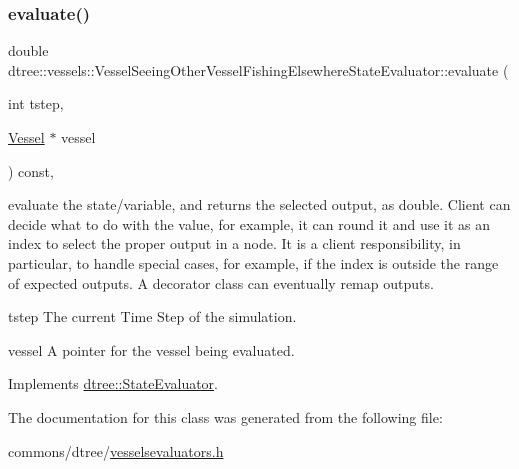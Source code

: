 \subsubsection{\texorpdfstring{evaluate()}{evaluate()}}
{\footnotesize\ttfamily double dtree\+::vessels\+::\+Vessel\+Seeing\+Other\+Vessel\+Fishing\+Elsewhere\+State\+Evaluator\+::evaluate (\begin{DoxyParamCaption}\item[{int}]{tstep,  }\item[{\mbox{\hyperlink{class_vessel}{Vessel}} $\ast$}]{vessel }\end{DoxyParamCaption}) const\hspace{0.3cm}{\ttfamily [inline]}, {\ttfamily [virtual]}}



evaluate the state/variable, and returns the selected output, as double. Client can decide what to do with the value, for example, it can round it and use it as an index to select the proper output in a node. It is a client responsibility, in particular, to handle special cases, for example, if the index is outside the range of expected outputs. A decorator class can eventually remap outputs. 

\begin{DoxyItemize}
\item tstep The current Time Step of the simulation. \item vessel A pointer for the vessel being evaluated. \end{DoxyItemize}


Implements \mbox{\hyperlink{classdtree_1_1_state_evaluator_ab57666219fbdc728f40d9d5acd5726cb}{dtree\+::\+State\+Evaluator}}.



The documentation for this class was generated from the following file\+:\begin{DoxyCompactItemize}
\item 
commons/dtree/\mbox{\hyperlink{vesselsevaluators_8h}{vesselsevaluators.\+h}}\end{DoxyCompactItemize}
